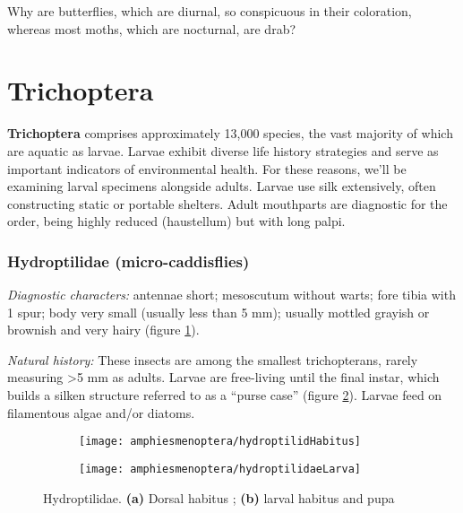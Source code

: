 \begin{theo}
{}Why are butterflies, which are diurnal, so conspicuous in their coloration, whereas most moths, which are nocturnal, are drab?
\end{theo}

\FloatBarrier
\section{Trichoptera}\label{Trichoptera}

\noindent{}\textbf{Trichoptera} comprises approximately 13,000 species, the vast majority of which are aquatic as larvae. Larvae exhibit diverse life history strategies and serve as important indicators of environmental health. For these reasons, we'll be examining larval specimens alongside adults. Larvae use silk extensively, often constructing static or portable shelters. Adult mouthparts are diagnostic for the order, being highly reduced (haustellum) but with long palpi.

\subsubsection{Hydroptilidae (micro-caddisflies)}
\noindent{}\textit{Diagnostic characters:} antennae short; mesoscutum without warts; fore tibia with 1 spur; body very small (usually less than 5 mm); usually mottled grayish or brownish and very hairy (figure \ref{fig:hydrop1}).\vspace{3mm}

\noindent{}\textit{Natural history:} These insects are among the smallest trichopterans, rarely measuring \textgreater5 mm as adults. Larvae are free-living until the final instar, which builds a silken structure referred to as a ``purse case'' (figure \ref{fig:hydroptilid2}). Larvae feed on filamentous algae and/or diatoms.

\begin{figure}[ht!]
    \centering
    \begin{subfigure}[ht!]{0.6\textwidth}
        \texttt{[image: amphiesmenoptera/hydroptilidHabitus]}
        \caption{}
        \label{fig:hydrop1}
    \end{subfigure}
    \hfill
    \begin{subfigure}[ht!]{0.28\textwidth}
        \texttt{[image: amphiesmenoptera/hydroptilidaeLarva]}
        \caption{}
        \label{fig:hydroptilid2}
    \end{subfigure}
    \caption{Hydroptilidae. \textbf{(a)} Dorsal habitus \citep[modified from Fig. 540 in][]{bhl50956}; \textbf{(b)} larval habitus and pupa \citep[Modified from Fig. 1372 in][]{bhlitem118010freshwater}}\label{fig:hydroptilids}
\end{figure}

